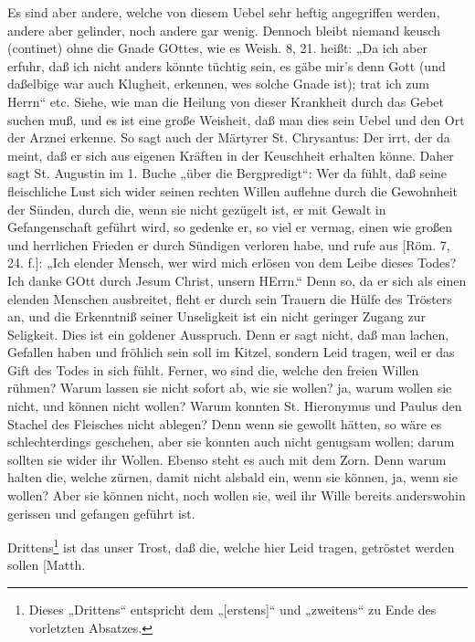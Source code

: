 Es sind aber andere, welche von diesem Uebel sehr heftig angegriffen werden, andere aber gelinder, noch andere gar wenig. Dennoch bleibt niemand keusch (continet) ohne die Gnade GOttes, wie es Weish. 8, 21. heißt: „Da ich aber erfuhr, daß ich nicht anders könnte tüchtig sein, es gäbe mir’s denn Gott (und daßelbige war auch Klugheit, erkennen, wes solche Gnade ist); trat ich zum Herrn“ etc. Siehe, wie man die Heilung von dieser Krankheit durch das Gebet suchen muß, und es ist eine große Weisheit, daß man dies sein Uebel und den Ort der Arznei erkenne. So sagt auch der Märtyrer St. Chrysantus: Der irrt, der da meint, daß er sich aus eigenen Kräften in der Keuschheit erhalten könne. Daher sagt St. Augustin im 1. Buche „über die Bergpredigt“: Wer da fühlt, daß seine fleischliche Lust sich wider seinen rechten Willen auflehne durch die Gewohnheit der Sünden, durch die, wenn sie nicht gezügelt ist, er mit Gewalt in Gefangenschaft geführt wird, so gedenke er, so viel er vermag, einen wie großen und herrlichen Frieden er durch Sündigen verloren habe, und rufe aus [Röm. 7, 24. f.]: „Ich elender Mensch, wer wird mich erlösen von dem Leibe dieses Todes? Ich danke GOtt durch Jesum Christ, unsern HErrn.“ Denn so, da er sich als einen elenden Menschen ausbreitet, fleht er durch sein Trauern die Hülfe des Trösters an, und die Erkenntniß seiner Unseligkeit ist ein nicht geringer Zugang zur Seligkeit. Dies ist ein goldener Ausspruch. Denn er sagt nicht, daß man lachen, Gefallen haben und fröhlich sein soll im Kitzel, sondern Leid tragen, weil er das Gift des Todes in sich fühlt. Ferner, wo sind die, welche den freien Willen rühmen? Warum lassen sie nicht sofort ab, wie sie wollen? ja, warum wollen sie nicht, und können nicht wollen? Warum konnten St. Hieronymus und Paulus den Stachel des Fleisches nicht ablegen? Denn wenn sie gewollt hätten, so wäre es schlechterdings geschehen, aber sie konnten auch nicht genugsam wollen; darum sollten sie wider ihr Wollen. Ebenso steht es auch mit dem Zorn. Denn warum halten die, welche zürnen, damit nicht alsbald ein, wenn sie können, ja, wenn sie wollen? Aber sie können nicht, noch wollen sie, weil ihr Wille bereits anderswohin gerissen und gefangen geführt ist.

Drittens\footnote{Dieses „Drittens“ entspricht dem „[erstens]“ und „zweitens“ zu Ende des vorletzten Absatzes.} ist das unser Trost, daß die, welche hier Leid tragen, getröstet werden sollen [Matth.

